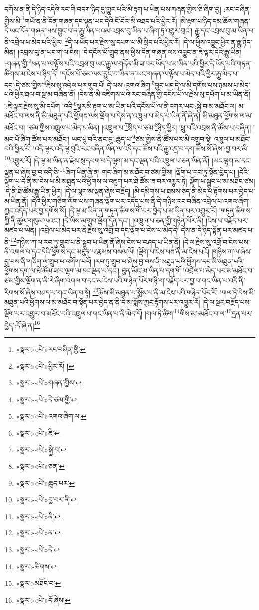 དགོས་ན་ནི་དེ་ཉིད་འདིའི་རང་གི་བདག་ཉིད་དུ་གྱུར་པའི་མི་རྟག་པ་ཡིན་པས་གཞན་གྱིས་ཅི་ཞིག་བྱ། :རང་བཞིན་གྱིས་མི་\footnote{«སྣར་»«པེ་»རང་བཞིན་གྱི་}གཡོ་ན་ནི་དོན་གཞན་དང་ལྡན་ཡང་དེའི་ངོ་བོར་མི་འཐད་པའི་ཕྱིར་རོ། །མི་རྟག་པ་ཉིད་དམ་ཆོས་གཞན་དེ་ཡང་དོན་གཞན་ལས་བྱུང་བ་ན་རྒྱུ་ཡིན་པའམ་འབྲས་བུ་ཡིན་པ་ཞིག་ཏུ་འགྱུར་གྲང་། རྒྱུ་དང་འབྲས་བུ་མ་ཡིན་པ་ནི་འབྲེལ་པ་མེད་པའི་ཕྱིར། \footnote{«སྣར་»«པེ་»ཕྱིར་རོ། ། }དེ་ལ་ཡོད་པར་རྗེས་སུ་དཔག་པ་མི་སྲིད་པའི་ཕྱིར་རོ། །དེ་ལ་ཕྱིས་འབྱུང་ཕྱིར་ན་རྒྱུ་ཉིད་མིན། །འབྲས་བུ་ན་ཡང་ག་ལ་ངེས། །དེ་དངོས་པོ་གྲུབ་ནས་ཕྱིས་དོན་གཞན་ལས་འབྱུང་ན་ཇི་ལྟར་དེའི་རྒྱུ་ཡིན། :གཞན་གྱི་\footnote{«སྣར་»«པེ་»གཞན་གྱིས་}ཕན་པ་ལ་ལྟོས་པའི་འབྲས་བུ་ཡང་རྒྱུ་ལ་གདོན་མི་ཟ་བར་ཡོད་པ་མ་ཡིན་པའི་ཕྱིར་དེ་ཡོད་པའི་གཏན་ཚིགས་མ་ངེས་པ་ཉིད་དོ། །དངོས་པོ་ཙམ་ལས་བྱུང་བ་ཡིན་ན་ཡང་གཞན་ལ་ལྟོས་པ་མེད་པའི་ཕྱིར་རྒྱུ་མེད་པ་དང་:དེ་ཙམ་གྱིས་\footnote{«སྣར་»«པེ་»དེ་ཙམ་གྱི་}རྗེས་སུ་འབྲེལ་པར་གྲུབ་པོ། དེ་ལས་:འགའ་ཞིག་\footnote{«སྣར་»«པེ་»འགའ་ཞིག་ལ་}བྱུང་ཡང་དེ་ལ་མི་དགོས་པས་ཉམས་པ་མེད་པའི་ཕྱིར་ཐལ་བ་སྔ་མ་བཞིན་ནོ། །དེས་ན་མི་འཇིགས་པའི་རང་བཞིན་གྱི་དངོས་པོ་ལ་རྗེས་སུ་དཔོག་པ་མ་ཡིན་ནོ། །:ཇི་ལྟར་རྗེས་སུ་མི་དཔོག །འདི་\footnote{«སྣར་»«པེ་»ཇི་}ལྟར་མི་རྟག་པ་མ་ཡིན་པའི་དངོས་པོ་ལ་ནི་འགར་ཡང་:སྐྱེ་བ་མ་མཐོང་ལ། མ་མཐོང་བ་ལས་ནི་མི་མཐུན་པའི་ཕྱོགས་ལས་ལྡོག་པ་དེས་ན་འཁྲུལ་པ་མེད་པ་ཡིན་ནོ་ཞེ་ན། མི་མཐུན་ཕྱོགས་ལ་མ་མཐོང་བ། །ཙམ་གྱིས་འཁྲུལ་པ་མེད་པ་མིན། །འཁྲུལ་པ་\footnote{«སྣར་»«པེ་»སྐྱེ་བ་}སྲིད་པ་ཙམ་\footnote{«སྣར་»«པེ་»ཅན་}ཉིད་ཕྱིར། །ཕྲུ་བའི་འབྲས་ནི་ཚོས་པ་བཞིན། །མང་པོ་ཞིག་ཚོས་པར་མཐོང་། ཡང་ཕྲུ་བའི་ནང་དུ་:ཆུད་པ་\footnote{«སྣར་»«པེ་»ཆུད་པར་}ཙམ་གྱིས་ནི་ཚོས་པར་མི་འགྲུབ་སྟེ། འཁྲུལ་པ་མཐོང་བའི་ཕྱིར་རོ། །འདི་ལྟར་འདི་ལྟ་བུའི་རང་བཞིན་ཡིན་ལ་འདི་དང་ཚོས་པའི་རྒྱུ་འདྲ་བ་དག་ཚོས་སོ་ཞེས་:བྱ་བར་མི་\footnote{«སྣར་»«པེ་»བྱ་བར་ནི་}འགྱུར་རོ། །དེ་ལྟ་མ་ཡིན་ན་རྗེས་སུ་དཔག་པ་དེ་ལྷག་མ་དང་ལྡན་པའི་འཁྲུལ་པ་ཅན་ཡིན་ནོ། །ཡང་ལྷག་མ་དང་ལྡན་པ་ཞེས་བྱ་བ་འདི་ཅི་\footnote{«སྣར་»«པེ་»ནི་}ཞིག་ཡིན་ཞེ་ན། གང་ཞིག་མ་མཐོང་བ་ཙམ་གྱིས། །ལྡོག་པ་རབ་ཏུ་སྟོན་བྱེད་པ། །དེའི་ལྡོག་པ་དེ་ནི་མ་ངེས་པ་མི་མཐུན་པའི་ཕྱོགས་ལ་འཇུག་པར་ཐེ་ཚོམ་ཟ་བར་འགྱུར་ཏེ། ལྡོག་པ་སྒྲུབ་པ་མ་མཐོང་ཙམ། །དེ་ནི་ཐེ་ཚོམ་རྒྱུ་ཡིན་ཕྱིར། །དེ་ལ་ལྷག་མ་ལྡན་ཞེས་བརྗོད། །མི་དམིགས་པ་ཐམས་ཅད་ནི་མེད་པ་རྟོགས་པར་བྱེད་པ་མ་ཡིན་ནོ། །དེའི་ཕྱིར་གཅིག་ལོག་པས་གཞན་ལྡོག་པར་འདོད་པས་ནི་དེ་གཉིས་རང་བཞིན་འབྲེལ་པ་འགའ་ཞིག་ཀྱང་འདོད་པར་བྱ་དགོས་སོ། །དེ་ལྟ་མ་ཡིན་ན་གཏན་ཚིགས་གོ་བར་བྱེད་པ་མ་ཡིན་པར་འགྱུར་རོ། །གཏན་ཚིགས་ཀྱི་ནི་ཚུལ་གསུམ་ལའང་། །དེ་ཡིས་མ་གྲུབ་ལྡོག་དོན་དང་། །འཁྲུལ་པ་ཅན་གྱི་གཉེན་པོར་ནི། །ངེས་པ་བརྗོད་པར་མཛད་པ་ཡིན། །འབྲེལ་པ་མེད་པར་ནི་རྗེས་སུ་འགྲོ་བ་དང་ལྡོག་པ་ངེས་པ་མེད་དེ། དེས་ན་དེ་ཉིད་སྟོན་པར་མཛད་པ་ནི་\footnote{«སྣར་»«པེ་»ན་}གཉིས་ཀ་ལ་རབ་ཏུ་གྲུབ་པ་ནི་སྒྲུབ་པ་ཡིན་ནོ་ཞེས་ངེས་པ་བཤད་པ་ཡིན་ནོ། །དེ་ལ་རྗེས་སུ་འགྲོ་བ་ངེས་པས་ནི་འགལ་བ་དང་དེའི་ཕྱོགས་དང་མཐུན་པ་རྣམས་བསལ་ལོ། །ལྡོག་པ་ངེས་པས་ནི་མ་ངེས་པའོ། །གཉིས་ཀ་ལ་ཞེས་བྱ་བས་ནི་གཅིག་ལ་གྲུབ་པ་འགོག་པའོ། །རབ་ཏུ་གྲུབ་པ་ཞེས་བྱ་བས་ནི་མཐུན་པའི་ཕྱོགས་དང་མི་མཐུན་པའི་ཕྱོགས་དག་ལ་ཐེ་ཚོམ་ཟ་བ་ལྷག་མ་དང་ལྡན་པ་དང་། ཐུན་མོང་མ་ཡིན་པ་དག་གོ །འབྲེལ་པ་མེད་པར་མ་མཐོང་བ་ཙམ་གྱིས་ལྡོག་ན་ནི་རེ་ཞིག་འགལ་བ་དང་མ་ངེས་པའི་གཉེན་པོར་གཉི་ག་བརྗོད་པར་བྱ་བ་གང་ཡིན་པ་འདི་ནི་རིགས་སོ་ཞེས་བཤད་པ་གང་ཡིན་པ་སྟེ། \footnote{«སྣར་»«པེ་»དེ་}ཆོས་མི་མཐུན་པ་སྨོས་པ་ནི་མ་ངེས་པའི་གཉེན་པོར་རོ། །གལ་ཏེ་དེས་མི་མཐུན་པའི་ཕྱོགས་ལ་མ་མཐོང་བ་སྟོན་པར་བྱེད་ན་ནི་དེ་མ་སྨོས་ཀྱང་རྟོགས་པར་འགྱུར་རོ། །དེ་ལ་སྔར་བརྗོད་པས་ལྡོག་པར་འགྱུར་བ་མཐོང་བའི་འཁྲུལ་པ་གང་ཡིན་པ་ནི་མེད་དོ། །གལ་ཏེ་ཚིག་\footnote{«སྣར་»ཚིགས་}གིས་མ་:མཐོང་བ་ལ་\footnote{«སྣར་»མཐོང་བ་}དྲན་པར་བྱེད་:དོ་ཞེ་ན།\footnote{«སྣར་»«པེ་»དོ་ཞེས།} 